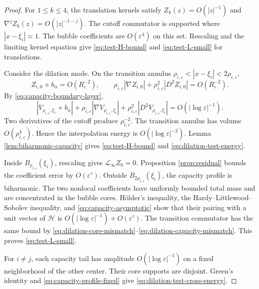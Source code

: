 \documentclass[11pt]{article}
\numberwithin{equation}{section}
\begin{document}
\begin{proof}
For $1\leq k\leq4$, the translation kernels satisfy
$Z_k(z)=O(|z|^{-1})$ and
$\nabla^jZ_k(z)=O(|z|^{-1-j})$. The cutoff commutator is supported
where $|x-\xi_i|\asymp1$. The bubble coefficients are
$O(\varepsilon^4)$ on this set. Rescaling and the limiting kernel
equation give \eqref{eq:test-H-bound} and
\eqref{eq:test-L-small} for translations.

Consider the dilation mode. On the transition annulus
$\rho_{i,\varepsilon}<|x-\xi_i|<2\rho_{i,\varepsilon}$,
\begin{equation}\label{eq:dilation-core-mismatch}
Z_{i,0}+b_\alpha=O(R_\varepsilon^{-2}),
\qquad
\rho_{i,\varepsilon}|\nabla Z_{i,0}|
+\rho_{i,\varepsilon}^2|D^2Z_{i,0}|
=O(R_\varepsilon^{-2}).
\end{equation}
By \eqref{eq:capacity-boundary-layer},
\begin{equation}\label{eq:dilation-capacity-mismatch}
|V_{\rho_{i,\varepsilon},\xi_i}+b_\alpha|
+\rho_{i,\varepsilon}|\nabla V_{\rho_{i,\varepsilon},\xi_i}|
+\rho_{i,\varepsilon}^2
|D^2V_{\rho_{i,\varepsilon},\xi_i}|
=O(|\log\varepsilon|^{-1}).
\end{equation}
Two derivatives of the cutoff produce
$\rho_{i,\varepsilon}^{-2}$. The transition annulus has volume
$O(\rho_{i,\varepsilon}^4)$. Hence the interpolation energy is
$O(|\log\varepsilon|^{-2})$. Lemma
\ref{lem:biharmonic-capacity} gives
\eqref{eq:test-H-bound} and \eqref{eq:dilation-test-energy}.

Inside $B_{\rho_{i,\varepsilon}}(\xi_i)$, rescaling gives
$\mathcal L_\infty Z_0=0$. Proposition \ref{prop:residual} bounds
the coefficient error by $O(\varepsilon^\tau)$. Outside
$B_{2\rho_{i,\varepsilon}}(\xi_i)$, the capacity profile is
biharmonic. The two nonlocal coefficients have uniformly bounded
total mass and are concentrated in the bubble cores. H\"older's
inequality, the Hardy--Littlewood--Sobolev inequality, and
\eqref{eq:capacity-asymptotic} show that their pairing with a unit
vector of $\mathcal H$ is
$O(|\log\varepsilon|^{-1})+O(\varepsilon^\tau)$. The transition
commutator has the same bound by
\eqref{eq:dilation-core-mismatch}--\eqref{eq:dilation-capacity-mismatch}.
This proves \eqref{eq:test-L-small}.

For $i\ne j$, each capacity tail has amplitude
$O(|\log\varepsilon|^{-1})$ on a fixed neighborhood of the other
center. Their core supports are disjoint. Green's identity and
\eqref{eq:capacity-profile-fixed} give
\eqref{eq:dilation-test-cross-energy}.
\end{proof}
\end{document}
